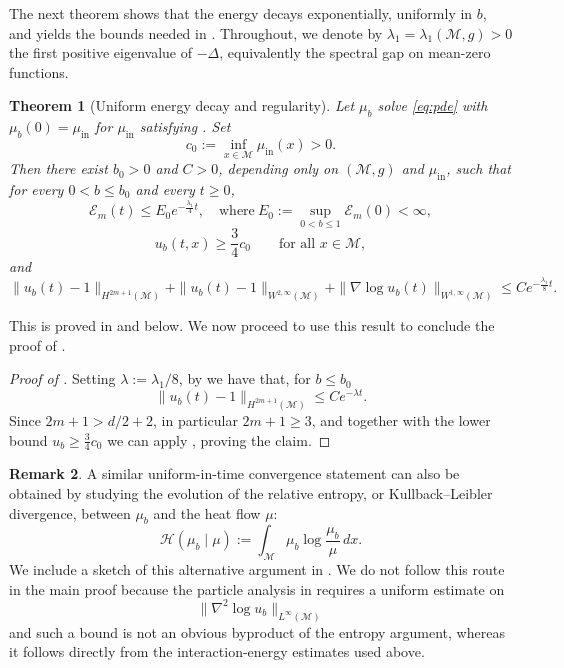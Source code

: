 \documentclass[11pt]{article}
\newtheorem{theorem}{Theorem}[section]
\theoremstyle{definition}
\newtheorem{remark}[theorem]{Remark}
\def\M{\mathcal M}
\begin{document}
The next theorem shows that the energy decays exponentially, uniformly in
$b$, and yields the bounds needed in .
 Throughout, we denote by $\lambda_1=\lambda_1(\M,g)>0$ the first positive eigenvalue of $-\Delta$, equivalently the spectral gap on mean-zero functions.

\begin{theorem}[Uniform energy decay and regularity]\label{thm:main_decay}
Let $\mu_b$ solve \eqref{eq:pde} with $\mu_b(0)=\mu_{\mathrm{in}}$ for $\mu_{\mathrm{in}}$ satisfying . Set 
\[
c_0:=\inf_{x\in \M}\mu_{\mathrm{in}}(x)>0.
\]
Then there exist $b_0>0$ and $C>0$, depending only on  $(\M,g)$ and $\mu_{\mathrm{in}}$, such that for every $0<b\le b_0$ and every $t\ge0$,
\[
\mathcal E_m(t)\le E_0 e^{-\frac{ \lambda_1}{4}t},
\quad\text{where}\
E_0:=\sup_{0<b\le1}\mathcal E_m(0)<\infty,
\]
\[
u_b(t,x)\ge \frac{3}{4}c_0
\qquad\text{for all }x\in \M,
\]
and
\[
\|u_b(t)-1\|_{H^{2m+1}( \M)}+
\|u_b(t)-1\|_{W^{2,\infty}( \M)}+\|\nabla \log u_b(t)\|_{W^{1,\infty}( \M)}\le C e^{-\frac{ \lambda_1}{8}t}.
\]
\end{theorem}

\noindent
This is proved in  and  below. We now proceed to use this result to
conclude the proof of .

\begin{proof}[Proof of \Cref{thm:main_convergence}]
Setting \(\lambda:=\lambda_1/8\), by  we have that, for $b \leq b_0$
\[
\|u_b(t)-1\|_{H^{2m+1}(\M)}
\le
Ce^{-\lambda t}.
\]
    Since \(2m+1>d/2+2\), in particular \(2m+1\ge3\), and together with the lower bound $u_b\geq \frac{3}{4}c_0$ we can apply , proving the claim.
\end{proof}


\begin{remark}\label{rem:entropy_route}
A similar uniform-in-time convergence statement can also be obtained by
studying the evolution of the relative entropy, or Kullback--Leibler
divergence, between $\mu_b$ and the heat flow $\mu$:
\[
\mathcal H(\mu_b\mid\mu)
:=
\int_\M \mu_b\log\frac{\mu_b}{\mu}\,dx .
\]
We include a sketch of
this alternative argument in .  We do not follow
this route in the main proof because the particle analysis in \Cref{sec:s1} requires a
uniform estimate on
\[
\|\nabla^2\log u_b\|_{L^\infty(\M)}
\]
and such a bound is not an obvious byproduct of the entropy argument, whereas
it follows directly from the interaction-energy estimates used above.
\end{remark}
\end{document}
